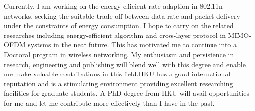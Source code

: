 \documentclass[conference,onecolumn]{IEEEtran}
\begin{document}
Currently, I am working on the energy-efficient rate adaption in 802.11n networks, seeking the suitable trade-off between data rate and packet delivery under the constraints of energy consumption. I hope to carry on the related researches including energy-efficient algorithm and cross-layer protocol in MIMO-OFDM systems in the near future. This has motivated me to continue into a Doctoral program in wireless networking. My enthusiasm and persistence in research, engineering and publishing will blend well with this degree and enable me make valuable contributions in this field.HKU has a good international reputation and is a stimulating environment providing excellent researching facilities for graduate students. A PhD degree from HKU will avail opportunities for me and let me contribute more effectively than I have in the past.
\end{document}
